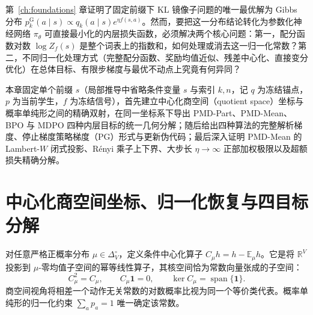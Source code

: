 \documentclass[lang=cn,scheme=chinese,openany]{elegantbook}
\newcommand{\E}{\mathbb E}
\newcommand{\R}{\mathbb R}
\begin{document}
第~\ref{ch:foundations} 章证明了固定前缀下 KL 镜像子问题的唯一最优解为 Gibbs 分布 $p_k^{\mathrm G}(a\mid s)\propto q_k(a\mid s)e^{\eta f(s,a)}$。然而，要把这一分布结论转化为参数化神经网络 $\pi_\theta$ 可直接最小化的内层损失函数，必须解决两个核心问题：第一，配分函数对数 $\log Z_f(s)$ 是整个词表上的指数和，如何处理或消去这一归一化常数？第二，不同归一化处理方式（完整配分函数、奖励均值近似、残差中心化、直接变分优化）在总体目标、有限步梯度与最优不动点上究竟有何异同？

本章固定单个前缀 $s$（局部推导中省略条件变量 $s$ 与索引 $k,n$，记 $q$ 为冻结锚点，$p$ 为当前学生，$f$ 为冻结信号），首先建立中心化商空间（quotient space）坐标与概率单纯形之间的精确双射，在同一坐标系下导出 PMD-Part、PMD-Mean、BPO 与 MDPO 四种内层目标的统一几何分解；随后给出四种算法的完整解析梯度、停止梯度策略梯度（PG）形式与更新伪代码；最后深入证明 PMD-Mean 的 Lambert-$W$ 闭式投影、R\'enyi 乘子上下界、大步长 $\eta\to\infty$ 正部加权极限以及超额损失精确分解。

\section{中心化商空间坐标、归一化恢复与四目标分解}
\label{sec:inner-quotient}

对任意严格正概率分布 $\mu\in\Delta_V^\circ$，定义条件中心化算子 $C_\mu h=h-\E_\mu h$。它是将 $\R^V$ 投影到 $\mu$-零均值子空间的幂等线性算子，其核空间恰为常数向量张成的子空间：
\begin{equation}
C_\mu^2=C_\mu,\qquad C_\mu\mathbf1=0,\qquad
\ker C_\mu=\operatorname{span}\{\mathbf1\}.
\end{equation}
商空间视角将相差一个动作无关常数的对数概率比视为同一个等价类代表。概率单纯形的归一化约束 $\sum_a p_a=1$ 唯一确定该常数。
\end{document}
